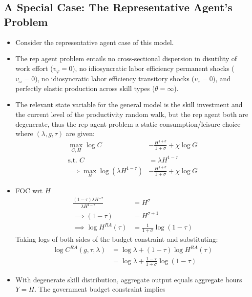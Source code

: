 \documentclass{article}
\begin{document}
\subsection{A Special Case: The Representative Agent's Problem}




\begin{itemize}
\item Consider the representative agent case of this model.
\item The rep agent problem entails no cross-sectional dispersion in disutility of work effort ($v_\varphi = 0$), no idiosyncratic labor efficiency permanent shocks ($v_\omega = 0$), no idiosyncratic labor efficiency transitory shocks ($v_\varepsilon = 0$), and perfectly elastic production across skill types ($\theta = \infty$).
\item The relevant state variable for the general model is the skill investment and the current level of the productivity random walk, but the rep agent both are degenerate, thus the rep agent problem a static consumption/leisure choice where $(\lambda, g, \tau)$ are given:
\begin{align}
\max_{C, H} \log C &- \frac{H^{1 + \sigma}}{1 + \sigma} + \chi \log G\\
\text{s.t. } C &= \lambda H^{1-\tau} \nonumber \\
\implies \max_{H} \log (\lambda H^{1-\tau}) &- \frac{H^{1 + \sigma}}{1 + \sigma} + \chi \log G \nonumber
\end{align}
\item FOC wrt $H$
\begin{align}
\frac{(1-\tau)\lambda H^{-\tau}}{\lambda H^{1-\tau}} &= H^\sigma  \nonumber \\
\implies
(1-\tau) &= H^{\sigma+1} \nonumber \\
\implies \log H^{RA}(\tau) &= \frac{1}{1 + \sigma} \log ( 1 - \tau)
\end{align}
Taking logs of both sides of the budget constraint and substituting:
\begin{align}
\log C^{RA}(g, \tau, \lambda) 
&= \log \lambda + (1-\tau) \log H^{RA}(\tau) \nonumber \\
&= \log \lambda +  \frac{1-\tau}{1 + \sigma} \log ( 1 - \tau) \label{c_ra_lambda}
\end{align}
\item With degenerate skill distribution, aggregate output equals aggregate hours $Y=H$. The government budget constraint implies
\begin{align*}

\end{align*}
\end{itemize}
\end{document}
